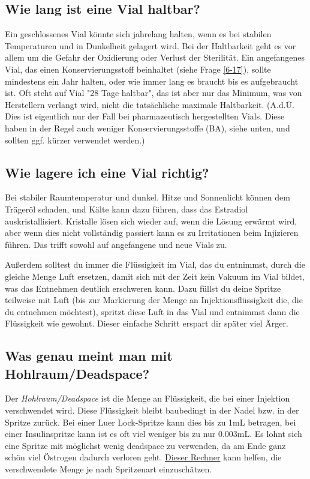 \documentclass{article}
\begin{document}
\subsection{Wie lang ist eine Vial haltbar?}\label{5-24}

Ein geschlossenes Vial könnte sich jahrelang halten, wenn es bei stabilen Temperaturen und in Dunkelheit gelagert wird. Bei der Haltbarkeit geht es vor allem um die Gefahr der Oxidierung oder Verlust der Sterilität. Ein angefangenes Vial, das einen Konservierungsstoff beinhaltet (siehe Frage \ref{6-17}), sollte mindestens ein Jahr halten, oder wie immer lang es braucht bis es aufgebraucht ist. Oft steht auf Vial "28 Tage haltbar", das ist aber nur das Minimum, was von Herstellern verlangt wird, nicht die tatsächliche maximale Haltbarkeit. (A.d.Ü. Dies ist eigentlich nur der Fall bei pharmazeutisch hergestellten Vials. Diese haben in der Regel auch weniger Konservierungsstoffe (BA), siehe unten, und sollten ggf. kürzer verwendet werden.)

\subsection{Wie lagere ich eine Vial richtig?}\label{5-25}

Bei stabiler Raumtemperatur und dunkel. Hitze und Sonnenlicht können dem Trägeröl schaden, und Kälte kann dazu führen, dass das Estradiol auskristallisiert. Kristalle lösen sich wieder auf, wenn die Lösung erwärmt wird, aber wenn dies nicht vollständig passiert kann es zu Irritationen beim Injizieren führen. Das trifft sowohl auf angefangene und neue Vials zu.

Außerdem solltest du immer die Flüssigkeit im Vial, das du entnimmst, durch die gleiche Menge Luft ersetzen, damit sich mit der Zeit kein Vakuum im Vial bildet, was das Entnehmen deutlich erschweren kann. Dazu füllst du deine Spritze teilweise mit Luft (bis zur Markierung der Menge an Injektionsflüssigkeit die, die du entnehmen möchtest), spritzt diese Luft in das Vial und entnimmst dann die Flüssigkeit wie gewohnt. Dieser einfache Schritt erspart dir später viel Ärger.

\subsection{Was genau meint man mit Hohlraum/Deadspace?}\label{5-26}

Der \textit{Hohlraum/Deadspace} ist die Menge an Flüssigkeit, die bei einer Injektion verschwendet wird. Diese Flüssigkeit bleibt baubedingt in der Nadel bzw. in der Spritze zurück. Bei einer Luer Lock-Spritze kann dies bis zu 1mL betragen, bei einer Insulinspritze kann ist es oft viel weniger bis zu nur 0.003mL. Es lohnt sich eine Spritze mit möglichst wenig deadspace zu verwenden, da am Ende ganz schön viel Östrogen dadurch verloren geht. \href{https://web.archive.org/web/20260307075103/https://hrtcafe.net/Calc/}{Dieser Rechner} kann helfen, die verschwendete Menge je nach Spritzenart einzuschätzen.
\end{document}
